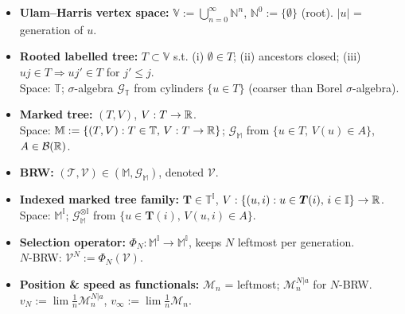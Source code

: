 \begin{itemize}
    \item \textbf{Ulam--Harris vertex space:}
    $\mathbb V:=\bigcup_{n=0}^\infty\mathbb N^n$, $\mathbb N^0:=\{\emptyset\}$ (root).
    $|u|$ = generation of $u$.
    \item \textbf{Rooted labelled tree:} $T\subset\mathbb V$ s.t.
    (i) $\emptyset\in T$;
    (ii) ancestors closed;
    (iii) $uj\in T\Rightarrow uj'\in T$ for $j'\le j$.
    \\ 
    Space: $\mathbb T$; $\sigma$-algebra $\mathcal G_{\mathbb T}$ from cylinders $\{u\in T\}$ (coarser than Borel $\sigma$-algebra).
    \item \textbf{Marked tree:} $(T,V)$, $V:T\to\mathbb{R}$. \\
    Space: $\mathbb M:=\{(T,V):T\in\mathbb T,\,V:T\to\mathbb{R}\}$;
    $\mathcal G_{\mathbb M}$ from $\{u\in T,\,V(u)\in A\}$, $A\in\mathcal B(\mathbb{R})$.
    \item \textbf{BRW:} $(\mathcal T,\mathcal V)\in(\mathbb M,\mathcal G_{\mathbb M})$, denoted $\mathcal V$.
    \item \textbf{Indexed marked tree family:} $\boldsymbol T\in\mathbb T^{\mathbb I}$, $V:\{(u,i):u\in\boldsymbol T(i),\,i\in\mathbb I\}\to\mathbb{R}$.\\
    Space: $\mathbb M^{\mathbb I}$; $\mathcal G_{\mathbb M}^{\otimes\mathbb I}$ from $\{u\in\boldsymbol T(i),\,V(u,i)\in A\}$.
    \item \textbf{Selection operator:} $\Phi_N:\mathbb M^{\mathbb I}\to\mathbb M^{\mathbb I}$, keeps $N$ leftmost per generation.\\
    $N$-BRW: $\mathcal V^N:=\Phi_N(\mathcal V)$.
    \item \textbf{Position \& speed as functionals:}
    $\mathcal M_n$ = leftmost; $\mathcal M_n^{N|a}$ for $N$-BRW.\\
    $v_N:=\lim\frac{1}{n}\mathcal M_n^{N|a}$, $v_\infty:=\lim\frac{1}{n}\mathcal M_n$.
\end{itemize}
